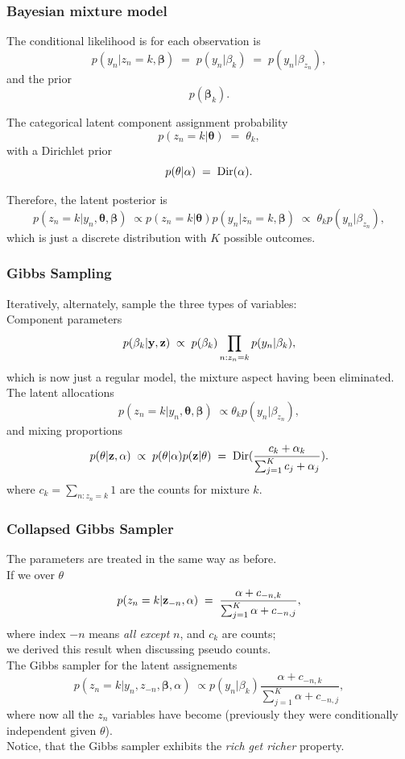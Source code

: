\begin{frame}
\frametitle{Bayesian mixture model}

The conditional likelihood is for each observation is
\[
p(y_n|z_n=k,\boldsymbol\beta)\;=\;p(y_n|\beta_k)\;=\;p(y_n|\beta_{z_n}),
\]
and the prior
\[
p(\boldsymbol\beta_k).
\]

The categorical latent component assignment probability
\[
p(z_n=k|\boldsymbol\theta)\;=\;\theta_k,
\]
with a Dirichlet prior
\[
p(\theta|\alpha)\;=\;{\rm Dir}(\alpha).
\]

Therefore, the latent posterior is
\[
p(z_n=k|y_n,\boldsymbol\theta,\boldsymbol\beta)\;\propto
p(z_n=k|\boldsymbol\theta)p(y_n|z_n=k,\boldsymbol\beta)\;\propto\;
\theta_k p(y_n|\beta_{z_n}),
\]
which is just a discrete distribution with $K$ possible outcomes.
\end{frame}


\begin{frame}
\frametitle{Gibbs Sampling}

Iteratively, alternately, sample the three types of variables:\\[1ex]

Component parameters
\[
p(\beta_k|{\bf y},{\bf z})\;\propto\;p(\beta_k)\prod_{n:z_n=k}p(y_n|\beta_k),
\]
which is now just a regular model, the mixture aspect having been eliminated.\\[1ex]

The latent allocations
\[
p(z_n=k|y_n,\boldsymbol\theta,\boldsymbol\beta)\;\propto \theta_k
p(y_n|\beta_{z_n}),
\]
and mixing proportions
\[
p(\theta|{\bf z},\alpha)\;\propto\;p(\theta|\alpha)p({\bf z}|\theta)\;=\;
{\rm Dir}(\frac{c_k+\alpha_k}{\sum_{j=1}^K c_j+\alpha_j}).
\]
where $c_k=\sum_{n:z_n=k}1$ are the counts for mixture $k$.
\end{frame}

\begin{frame}
\frametitle{Collapsed Gibbs Sampler}

The parameters are treated in the same way as before.\\[1ex]

If we  over $\theta$
\[
p(z_n=k|{\bf z}_{-n},\alpha)\;=\;\frac{\alpha+c_{-n,k}}{\sum_{j=1}^K\alpha+c_{-n,j}},
\]
where index $-n$ means \emph{all except} $n$, and $c_k$ are counts;\\
we derived this result when discussing pseudo counts.\\[1ex]

The  Gibbs sampler for the latent assignements
\[
p(z_n=k|y_n,z_{-n},\boldsymbol\beta,\alpha)\;\propto
p(y_n|\beta_k)\frac{\alpha+c_{-n,k}}{\sum_{j=1}^K\alpha+c_{-n,j}},
\]
where now all the $z_n$ variables have become  (previously
they were conditionally independent given $\theta$).\\[1ex]

Notice, that the Gibbs sampler exhibits the \emph{rich get richer} property.
\end{frame}

